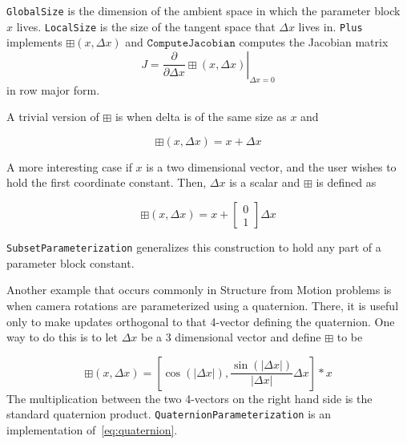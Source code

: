 \texttt{GlobalSize} is the dimension of the ambient space in which the parameter block $x$ lives. \texttt{LocalSize} is the size of the tangent space that $\Delta x$ lives in. \texttt{Plus} implements $\boxplus(x,\Delta x)$ and $\texttt{ComputeJacobian}$ computes the Jacobian matrix
\begin{equation}
	J = \left . \frac{\partial }{\partial \Delta x} \boxplus(x,\Delta x)\right|_{\Delta x = 0}
\end{equation}
in row major form.

A trivial version of $\boxplus$ is when delta is of the same size as $x$
and

\begin{equation}
  \boxplus(x, \Delta x) = x + \Delta x
\end{equation}

A more interesting case if $x$ is a two dimensional vector, and the
user wishes to hold the first coordinate constant. Then, $\Delta x$ is a
scalar and $\boxplus$ is defined as

\begin{equation}
  \boxplus(x, \Delta x) = x + \left[ \begin{array}{c} 0 \\ 1
                                  \end{array} \right]        \Delta x
\end{equation}

\texttt{SubsetParameterization} generalizes this construction to hold any part of a parameter block constant.


Another example that occurs commonly in Structure from Motion problems
is when camera rotations are parameterized using a quaternion. There,
it is useful only to make updates orthogonal to that 4-vector defining
the quaternion. One way to do this is to let $\Delta x$ be a 3
dimensional vector and define $\boxplus$ to be

\begin{equation}
  \boxplus(x, \Delta x) =
\left[
\cos(|\Delta x|), \frac{\sin\left(|\Delta x|\right)}{|\Delta x|} \Delta x
\right] * x
\label{eq:quaternion}
\end{equation}
The multiplication between the two 4-vectors on the right hand
side is the standard quaternion product. \texttt{QuaternionParameterization} is an implementation of~\eqref{eq:quaternion}.

\clearpage

